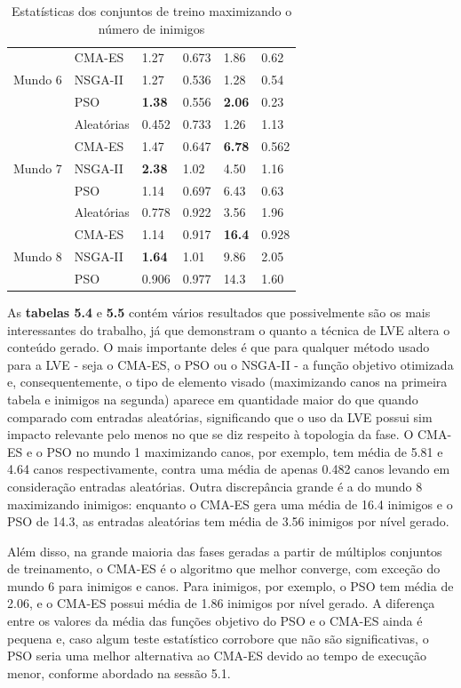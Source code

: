 \begin{table}[h]
\begin{tabular}{|p{2cm}|p{3cm}|p{2cm}|p{2cm}|p{2cm}|p{2cm}|}
        & CMA-ES & 1.27 & 0.673 & 1.86 & 0.62 \\
        Mundo 6 & NSGA-II & 1.27 & 0.536 & 1.28 & 0.54 \\
	& PSO & \textbf{1.38} & 0.556 & \textbf{2.06} & 0.23 \\
        \hline
        & Aleatórias & 0.452 & 0.733 & 1.26 & 1.13 \\
	& CMA-ES & 1.47 & 0.647 & \textbf{6.78} & 0.562 \\
	Mundo 7 & NSGA-II & \textbf{2.38} & 1.02 & 4.50 & 1.16 \\
         & PSO & 1.14 & 0.697 & 6.43 & 0.63 \\
        \hline
        & Aleatórias & 0.778 & 0.922 & 3.56 & 1.96 \\
	& CMA-ES & 1.14 & 0.917 & \textbf{16.4} & 0.928 \\
	Mundo 8 & NSGA-II & \textbf{1.64} & 1.01 & 9.86 & 2.05 \\
        & PSO & 0.906 & 0.977 & 14.3 & 1.60 \\
        \hline
    \end{tabular}
    \caption{Estatísticas dos conjuntos de treino maximizando o número de inimigos}
    \label{tab:conjunto_treino}
\end{table}

As \textbf{tabelas 5.4} e \textbf{5.5} contém vários resultados que possivelmente são os mais interessantes do trabalho, já que demonstram o quanto a técnica de LVE altera o conteúdo gerado. O mais importante deles é que para qualquer método usado para a LVE - seja o CMA-ES, o PSO ou o NSGA-II - a função objetivo otimizada e, consequentemente, o tipo de elemento visado (maximizando canos na primeira tabela e inimigos na segunda) aparece em quantidade maior do que quando comparado com entradas aleatórias, significando que o uso da LVE possui sim impacto relevante pelo menos no que se diz respeito à topologia da fase. O CMA-ES e o PSO no mundo 1 maximizando canos, por exemplo, tem média de 5.81 e 4.64 canos respectivamente, contra uma média de apenas 0.482 canos levando em consideração entradas aleatórias. Outra discrepância grande é a do mundo 8 maximizando inimigos: enquanto o CMA-ES gera uma média de 16.4 inimigos e o PSO de 14.3, as entradas aleatórias tem média de 3.56 inimigos por nível gerado. 

Além disso, na grande maioria das fases geradas a partir de múltiplos conjuntos de treinamento, o CMA-ES é o algoritmo que melhor converge, com exceção do mundo 6 para inimigos e canos. Para inimigos, por exemplo, o PSO tem média de 2.06, e o CMA-ES possui média de 1.86 inimigos por nível gerado. A diferença entre os valores da média das funções objetivo do PSO e o CMA-ES ainda é pequena e, caso algum teste estatístico corrobore que não são significativas, o PSO seria uma melhor alternativa ao CMA-ES devido ao tempo de execução menor, conforme abordado na sessão 5.1.

